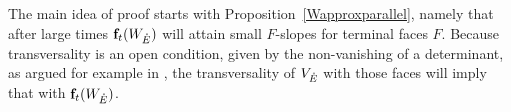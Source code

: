 The main idea of proof starts with Proposition~\ref{Wapproxparallel}, namely that after large times
 $\mathbf{f}_t(W_{\mathring{E}})$ will attain small $F$-slopes for terminal faces $F$.   Because
transversality is an open condition,
given by the non-vanishing of a determinant, as argued for example in \cite[Section 1.6]{GuPo74}, the
transversality of $V_{\mathring{E}}$ with those faces will imply that with $\mathbf{f}_t(W_{\mathring{E}})$.
\begin{comment}

\color{blue}
\bigskip
A new approach to making this precise!


\begin{definition}
Let $h$ and $k$ be linear maps from normed vector spaces $L_1$ and $L_2$ respectively to $\R^n$.  Denote unit spheres by $U(L_i)$.  Define the {\bf transversality measure},
denoted $\llangle h, k \rrangle$, as the maximum of $|\rm{Det} (v_1, \dots, v_n) |$, where
each $v_i$ is in the union of $h(U(L_1))$ and $k(U(L_2))$.

Let $f, g: V, W \to \R^n$ be smooth maps from c-manifolds with Riemannian metrics to $\R^n$ whose
pull-back is compact and path-connected.
Define the transversality measure $\llangle f, g \rrangle$ to
be the minimum over $z = f(x) = g(y)$ of $\llangle D_x f, D_y g \rrangle$.
\end{definition}


While the transversality measure is only defined for maps to $\R^n$ and  is for example highly sensitive to metric,
 it is useful topologically in that
it is continuous and it is non-zero only if $f$ and $g$ are transverse.  By continuity we mean the following.

\begin{proposition}
Let $V, W$ be c-manifolds and
consider the subspace $CP$ of pairs of smooth maps from $V$ and $W$ to $\R^n$ with  compact and path-connected
pull-back, with the $C^\infty$ topology.  Then $f, g \mapsto \llangle f, g \rrangle$ is a continuous map from $CP$ to $\R$.
\end{proposition}

SHOULD PROVE THIS!



Plan of attack:  Still work over $E \cong \interval^n$, so maps are to Euclidean space.  Start with $V_E$ transversal
to $F$ so $\llangle r_V, \iota_F\rrangle = m$ for some $m>0$.  Let $\tau_x \iota_F$ denote translation of $\iota_F$
by $x$.  Then continuity of transversality measure implies that there is some $\varepsilon$ so that $\llangle r_{V_E}, \iota_F\rrangle > m/2$ for any $\tau_x \iota_F$ whose image is in the $L^\infty$ neighborhood
$N_\varepsilon F$.  Thus also getting some lower bound $b$ for$ \llangle r_{V_E}, r_{\tau_x \iota_F \circ \phi} \rrangle$ for
any linear map.  Then use aspect ratio being arbitrarily large/small and simple facts about determinants to get
$| \llangle r_{V_E}, r_{\f_t(W_E)} \rrangle  - \llangle r_{V_E}, r_{\tau_x \iota_F \circ \phi} \rrangle | < b/2$
where $\phi$ is a projection map needed to compare $r_{\f_t(W_E)}$ and $r_{\tau_x \iota_F}$.
\color{black}

\bigskip

\end{comment}

